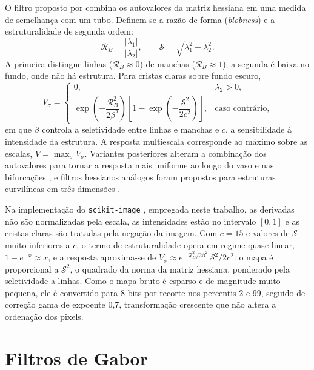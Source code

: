 \documentclass[12pt, oneside, a4paper, chapter=TITLE, section=TITLE,
               english, brazil]{abntex2}
\newcommand{\secao}[1]{\section[\texorpdfstring{\protect\MakeTextUppercase{#1}}{#1}]{#1}}
\begin{document}
O filtro proposto por \citet{Frangi1998} combina os autovalores da matriz
hessiana em uma medida de semelhança com um tubo. Definem-se a razão de forma
(\emph{blobness}) e a estruturalidade de segunda ordem:
\begin{equation}
  \mathcal{R}_B = \frac{|\lambda_1|}{|\lambda_2|},
  \qquad
  \mathcal{S} = \sqrt{\lambda_1^2 + \lambda_2^2}.
\end{equation}
A primeira distingue linhas ($\mathcal{R}_B \approx 0$) de manchas
($\mathcal{R}_B \approx 1$); a segunda é baixa no fundo, onde não há
estrutura. Para cristas claras sobre fundo escuro,
\begin{equation}
  V_\sigma =
  \begin{cases}
    0, & \lambda_2 > 0,\\[4pt]
    \exp\!\left(-\dfrac{\mathcal{R}_B^2}{2\beta^2}\right)
    \left[1 - \exp\!\left(-\dfrac{\mathcal{S}^2}{2c^2}\right)\right],
    & \text{caso contrário,}
  \end{cases}
  \label{eq:frangi}
\end{equation}
em que $\beta$ controla a seletividade entre linhas e manchas e $c$, a
sensibilidade à intensidade da estrutura. A resposta multiescala corresponde
ao máximo sobre as escalas, $V = \max_\sigma V_\sigma$. Variantes posteriores
alteram a combinação dos autovalores para tornar a resposta mais uniforme ao
longo do vaso e nas bifurcações \citep*{Jerman2016}, e filtros hessianos
análogos foram propostos para estruturas curvilíneas em três dimensões
\citep*{Sato1998}.

Na implementação do \texttt{scikit-image} \citep*{vanderWalt2014}, empregada
neste trabalho, as derivadas não são normalizadas pela escala, as
intensidades estão no intervalo $[0,1]$ e as cristas claras são tratadas pela
negação da imagem. Com $c = 15$ e valores de $\mathcal{S}$ muito inferiores a
$c$, o termo de estruturalidade opera em regime quase linear,
$1 - e^{-x} \approx x$, e a resposta aproxima-se de
$V_\sigma \approx e^{-\mathcal{R}_B^2/2\beta^2}\,\mathcal{S}^2/2c^2$: o mapa é
proporcional a $\mathcal{S}^2$, o quadrado da norma da matriz hessiana,
ponderado pela seletividade a linhas. Como o mapa bruto é esparso e de
magnitude muito pequena, ele é convertido para 8 bits por recorte nos
percentis 2 e 99, seguido de correção gama de expoente 0,7, transformação
crescente que não altera a ordenação dos pixels.

\secao{Filtros de Gabor}
\end{document}
